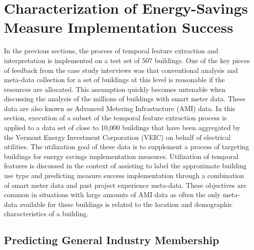 \chapter{Characterization of Energy-Savings Measure Implementation Success}
\label{sec:scalability}

In the previous sections, the process of temporal feature extraction and interpretation is implemented on a test set of 507 buildings. One of the key pieces of feedback from the case study interviews was that conventional analysis and meta-data collection for a set of buildings at this level is reasonable if the resources are allocated. This assumption quickly becomes untenable when discussing the analysis of the millions of buildings with smart meter data. These data are also known as Advanced Metering Infrastucture (AMI) data.  In this section, execution of a subset of the temporal feature extraction process is applied to a data set of close to 10,000 buildings that have been aggregated by the Vermont Energy Investment Corporation (VEIC) on behalf of electrical utilities. The utilization goal of these data is to supplement a process of targeting buildings for energy savings implementation measures. Utilization of temporal features is discussed in the context of assisting to label the approximate building use type and predicting measure success implementation through a combination of smart meter data and past project experience meta-data. These objectives are common in situations with large amounts of AMI data as often the only meta-data available for these buildings is related to the location and demographic characteristics of a building. 




\section{Predicting General Industry Membership}
\label{sec:predictinsiccode}

